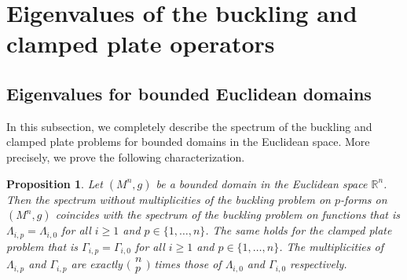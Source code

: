 \documentclass[10pt,a4paper]{amsart}
\numberwithin{equation}{section}
\newtheorem{Proposition}[Theorem]{Proposition}
\theoremstyle{definition}
\begin{document}
\section{Eigenvalues of the buckling and clamped plate operators}\label{s:ebs}

\subsection{Eigenvalues for bounded Euclidean domains}%

In this subsection, we completely describe the spectrum of the buckling and clamped plate problems for bounded domains in the Euclidean space. More precisely, we prove the following characterization.

\begin{Proposition}\label{BCP_Euclidean}
Let $(M^n,g)$ be a bounded domain in the Euclidean space $\mathbb{R}^n$.
Then the spectrum without multiplicities of the buckling problem on $p$-forms on $(M^n,g)$ coincides with the spectrum of the buckling problem on functions that is $\Lambda_{i,p}=\Lambda_{i,0}$ for all $i \geq 1$ and $p\in\{1,\dots,n\}$.
The same holds for the clamped plate problem that is $\Gamma_{i,p}=\Gamma_{i,0}$ for all $i \geq 1$ and $p\in\{1,\dots,n\}$.
The multiplicities of $\Lambda_{i,p}$ and $\Gamma_{i,p}$ are exactly $\bigl(\begin{smallmatrix}n\\ p\end{smallmatrix}\bigr)$ times those of $\Lambda_{i,0}$ and $\Gamma_{i,0}$ respectively.
\end{Proposition}
\end{document}
